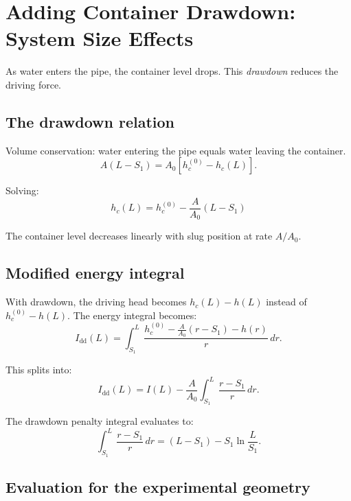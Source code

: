 \documentclass[11pt]{article}
\begin{document}
\section{Adding Container Drawdown: System Size Effects}
\label{sec:drawdown}

As water enters the pipe, the container level drops. This \emph{drawdown} reduces the driving force.

\subsection{The drawdown relation}

Volume conservation: water entering the pipe equals water leaving the container.
\[
  A(L - S_1) = A_0[h_c^{(0)} - h_c(L)].
\]

Solving:
\begin{equation}
  \boxed{h_c(L) = h_c^{(0)} - \frac{A}{A_0}(L - S_1)}
  \label{eq:drawdown}
\end{equation}

The container level decreases linearly with slug position at rate $A/A_0$.

\subsection{Modified energy integral}

With drawdown, the driving head becomes $h_c(L) - h(L)$ instead of $h_c^{(0)} - h(L)$. The energy integral becomes:
\begin{equation}
  I_{\text{dd}}(L) = \int_{S_1}^{L} \frac{h_c^{(0)} - \frac{A}{A_0}(r - S_1) - h(r)}{r} \, dr.
  \label{eq:I-dd-def}
\end{equation}

This splits into:
\begin{equation}
  I_{\text{dd}}(L) = I(L) - \frac{A}{A_0} \int_{S_1}^{L} \frac{r - S_1}{r} \, dr.
  \label{eq:I-dd-split}
\end{equation}

The drawdown penalty integral evaluates to:
\begin{equation}
  \int_{S_1}^{L} \frac{r - S_1}{r} \, dr = (L - S_1) - S_1 \ln\frac{L}{S_1}.
  \label{eq:drawdown-penalty}
\end{equation}

\subsection{Evaluation for the experimental geometry}
\end{document}
